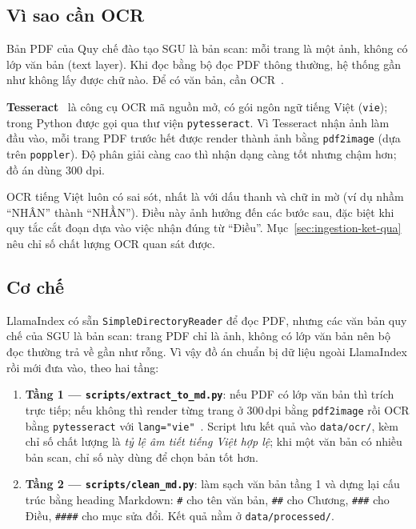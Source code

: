 \subsection{Vì sao cần OCR}

Bản PDF của Quy chế đào tạo SGU là bản scan: mỗi trang là một ảnh, không có lớp văn bản (text layer). Khi đọc bằng bộ đọc PDF thông thường, hệ thống gần như không lấy được chữ nào. Để có văn bản, cần OCR~\cite{tesseract}.

\textbf{Tesseract}~\cite{tesseract} là công cụ OCR mã nguồn mở, có gói ngôn ngữ tiếng Việt (\texttt{vie}); trong Python được gọi qua thư viện \texttt{pytesseract}. Vì Tesseract nhận ảnh làm đầu vào, mỗi trang PDF trước hết được render thành ảnh bằng \texttt{pdf2image} (dựa trên \texttt{poppler}). Độ phân giải càng cao thì nhận dạng càng tốt nhưng chậm hơn; đồ án dùng 300 dpi.

OCR tiếng Việt luôn có sai sót, nhất là với dấu thanh và chữ in mờ (ví dụ nhầm ``NHÂN'' thành ``NHẦN''). Điều này ảnh hưởng đến các bước sau, đặc biệt khi quy tắc cắt đoạn dựa vào việc nhận đúng từ ``Điều''. Mục~\ref{sec:ingestion-ket-qua} nêu chỉ số chất lượng OCR quan sát được.

\subsection{Cơ chế}

LlamaIndex có sẵn \texttt{SimpleDirectoryReader} để đọc PDF, nhưng các văn bản quy chế của SGU là
bản scan: trang PDF chỉ là ảnh, không có lớp văn bản nên bộ đọc thường trả về gần như rỗng. Vì vậy
đồ án chuẩn bị dữ liệu ngoài LlamaIndex rồi mới đưa vào, theo hai tầng:

\begin{enumerate}
  \item \textbf{Tầng 1 --- \texttt{scripts/extract\_to\_md.py}}: nếu PDF có lớp văn bản thì trích trực tiếp;
        nếu không thì render từng trang ở 300\,dpi bằng \texttt{pdf2image} rồi OCR bằng
        \texttt{pytesseract} với \texttt{lang="vie"}~\cite{tesseract}. Script lưu kết quả vào
        \texttt{data/ocr/}, kèm chỉ số chất lượng là \emph{tỷ lệ âm tiết tiếng Việt hợp lệ}; khi một
        văn bản có nhiều bản scan, chỉ số này dùng để chọn bản tốt hơn.
  \item \textbf{Tầng 2 --- \texttt{scripts/clean\_md.py}}: làm sạch văn bản tầng 1 và dựng lại cấu trúc
        bằng heading Markdown: \texttt{\#} cho tên văn bản, \texttt{\#\#} cho Chương,
        \texttt{\#\#\#} cho Điều, \texttt{\#\#\#\#} cho mục sửa đổi. Kết quả nằm ở \texttt{data/processed/}.
\end{enumerate}

